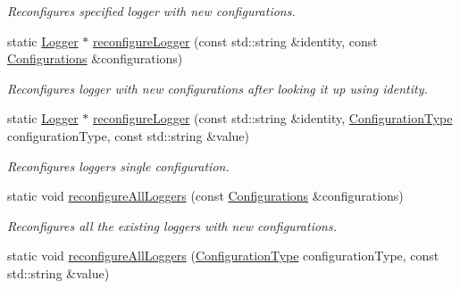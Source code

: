 \begin{DoxyCompactItemize}
\begin{DoxyCompactList}\small\item\em Reconfigures specified logger with new configurations. \end{DoxyCompactList}\item 
static \hyperlink{classel_1_1Logger}{Logger} $\ast$ \hyperlink{classel_1_1Loggers_a105f776fe19cb7fa2fccd2993d9f7a7c}{reconfigure\+Logger} (const std\+::string \&identity, const \hyperlink{classel_1_1Configurations}{Configurations} \&configurations)\hypertarget{classel_1_1Loggers_a105f776fe19cb7fa2fccd2993d9f7a7c}{}\label{classel_1_1Loggers_a105f776fe19cb7fa2fccd2993d9f7a7c}

\begin{DoxyCompactList}\small\item\em Reconfigures logger with new configurations after looking it up using identity. \end{DoxyCompactList}\item 
static \hyperlink{classel_1_1Logger}{Logger} $\ast$ \hyperlink{classel_1_1Loggers_aef49fdae329cefcc1c01428568dced4b}{reconfigure\+Logger} (const std\+::string \&identity, \hyperlink{namespaceel_a281f5db6d6163678bc68a8b23b59e124}{Configuration\+Type} configuration\+Type, const std\+::string \&value)\hypertarget{classel_1_1Loggers_aef49fdae329cefcc1c01428568dced4b}{}\label{classel_1_1Loggers_aef49fdae329cefcc1c01428568dced4b}

\begin{DoxyCompactList}\small\item\em Reconfigures logger\textquotesingle{}s single configuration. \end{DoxyCompactList}\item 
static void \hyperlink{classel_1_1Loggers_ac834df0f5e9e3dab18e70321a2543af7}{reconfigure\+All\+Loggers} (const \hyperlink{classel_1_1Configurations}{Configurations} \&configurations)\hypertarget{classel_1_1Loggers_ac834df0f5e9e3dab18e70321a2543af7}{}\label{classel_1_1Loggers_ac834df0f5e9e3dab18e70321a2543af7}

\begin{DoxyCompactList}\small\item\em Reconfigures all the existing loggers with new configurations. \end{DoxyCompactList}\item 
static void \hyperlink{classel_1_1Loggers_a1ebd33bc0208b430f41508e34509c7c9}{reconfigure\+All\+Loggers} (\hyperlink{namespaceel_a281f5db6d6163678bc68a8b23b59e124}{Configuration\+Type} configuration\+Type, const std\+::string \&value)\hypertarget{classel_1_1Loggers_a1ebd33bc0208b430f41508e34509c7c9}{}\label{classel_1_1Loggers_a1ebd33bc0208b430f41508e34509c7c9}


\end{DoxyCompactItemize}
